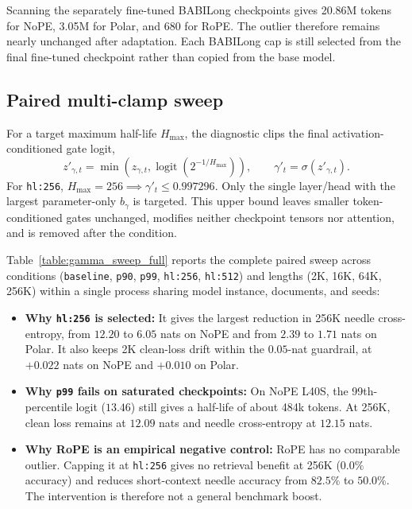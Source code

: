 Scanning the separately fine-tuned BABILong checkpoints gives 20.86M tokens for NoPE, 3.05M for Polar, and 680 for RoPE. The outlier therefore remains nearly unchanged after adaptation. Each BABILong cap is still selected from the final fine-tuned checkpoint rather than copied from the base model.

\subsection{Paired multi-clamp sweep}
For a target maximum half-life $H_{\max}$, the diagnostic clips the final activation-conditioned gate logit,
\begin{equation}
 z'_{\gamma,t}=\min\!\left(z_{\gamma,t},\operatorname{logit}(2^{-1/H_{\max}})\right),\qquad
 \gamma'_t=\sigma(z'_{\gamma,t}).
\end{equation}
For \texttt{hl:256}, $H_{\max}=256 \implies \gamma'_t\leq0.997296$. Only the single layer/head with the largest parameter-only $b_\gamma$ is targeted. This upper bound leaves smaller token-conditioned gates unchanged, modifies neither checkpoint tensors nor attention, and is removed after the condition.

Table~\ref{table:gamma_sweep_full} reports the complete paired sweep across conditions (\texttt{baseline}, \texttt{p90}, \texttt{p99}, \texttt{hl:256}, \texttt{hl:512}) and lengths (2K, 16K, 64K, 256K) within a single process sharing model instance, documents, and seeds:
\begin{itemize}
  \item \textbf{Why \texttt{hl:256} is selected:} It gives the largest reduction in 256K needle cross-entropy, from $12.20$ to $6.05$ nats on NoPE and from $2.39$ to $1.71$ nats on Polar. It also keeps 2K clean-loss drift within the $0.05$-nat guardrail, at $+0.022$ nats on NoPE and $+0.010$ on Polar.
  \item \textbf{Why \texttt{p99} fails on saturated checkpoints:} On NoPE L40S, the 99th-percentile logit ($13.46$) still gives a half-life of about 484k tokens. At 256K, clean loss remains at $12.09$ nats and needle cross-entropy at $12.15$ nats.
  \item \textbf{Why RoPE is an empirical negative control:} RoPE has no comparable outlier. Capping it at \texttt{hl:256} gives no retrieval benefit at 256K ($0.0\%$ accuracy) and reduces short-context needle accuracy from $82.5\%$ to $50.0\%$. The intervention is therefore not a general benchmark boost.
\end{itemize}

